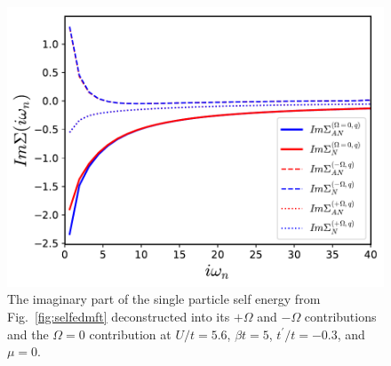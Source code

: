 \documentclass[twocolumn,notitlepage,prb,superscriptaddress,showpacs]{revtex4-1}
\begin{document}
\begin{figure}
\centering
       \includegraphics[width=0.95\linewidth]{self_energy_W0.pdf}
        \caption{\label{fig:posnegbose} The imaginary part of the single particle self energy from Fig.~\ref{fig:selfedmft} deconstructed into its  $+\Omega$ and $-\Omega$ contributions and the $\Omega=0$ contribution at $U/t=5.6$, $\beta t =5$, $t^\prime /t=-0.3$, and $\mu=0$. }
\end{figure}
\end{document}
